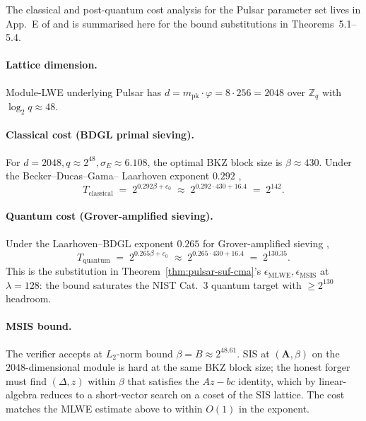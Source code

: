The classical and post-quantum cost analysis for the Pulsar parameter
set lives in App.~E of \cite{quasarcertsoundness} and is summarised
here for the bound substitutions in Theorems~5.1--5.4.

\paragraph{Lattice dimension.} Module-LWE underlying Pulsar has
$d = m_{\mathrm{pk}} \cdot \varphi = 8 \cdot 256 = 2048$ over
$\mathbb{Z}_q$ with $\log_2 q \approx 48$.

\paragraph{Classical cost (BDGL primal sieving).} For
$d = 2048, q \approx 2^{48}, \sigma_E \approx 6.108$, the optimal BKZ
block size is $\beta \approx 430$. Under the Becker--Ducas--Gama--
Laarhoven exponent $0.292$ \cite{bdgl2016},
\[
  T_{\mathrm{classical}}
  \;=\; 2^{0.292\beta + c_0}
  \;\approx\; 2^{0.292 \cdot 430 + 16.4}
  \;=\; 2^{142}.
\]

\paragraph{Quantum cost (Grover-amplified sieving).} Under the
Laarhoven--BDGL exponent $0.265$ for Grover-amplified
sieving \cite{laarhoven2015,bdgl2016},
\[
  T_{\mathrm{quantum}}
  \;=\; 2^{0.265 \beta + c_0}
  \;\approx\; 2^{0.265 \cdot 430 + 16.4}
  \;=\; 2^{130.35}.
\]
This is the substitution in Theorem~\ref{thm:pulsar-suf-cma}'s
$\epsilon_{\mathrm{MLWE}}, \epsilon_{\mathrm{MSIS}}$ at
$\lambda = 128$: the bound saturates the NIST Cat.~3 quantum target
with $\geq 2^{130}$ headroom.

\paragraph{MSIS bound.} The verifier accepts at $L_2$-norm bound
$\beta = B \approx 2^{48.61}$. SIS at $(\mathbf{A}, \beta)$ on the
$2048$-dimensional module is hard at the same BKZ block size; the
honest forger must find $(\Delta, z)$ within $\beta$ that satisfies the
$Az - bc$ identity, which by linear-algebra reduces to a
short-vector search on a coset of the SIS lattice. The cost
matches the MLWE estimate above to within $O(1)$ in the exponent.

